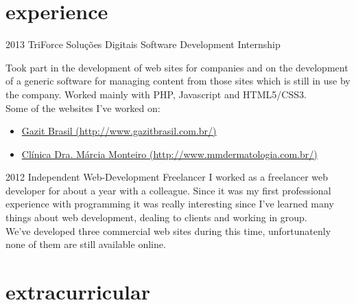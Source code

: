 \documentclass[]{friggeri-cv} %
\begin{document}

\section{experience}

\begin{entrylist}


\entry
{2013}
{TriForce Soluções Digitais}
{Software Development Internship}
{Took part in the development of web sites for companies and on the development of a generic software for managing content from those sites which is still in use by the company. Worked mainly with PHP, Javascript and HTML5/CSS3. \\
Some of the websites I've worked on:
\begin{itemize}
\item \href{http://www.gazitbrasil.com.br/}{Gazit Brasil (http://www.gazitbrasil.com.br/)}
\item \href{http://www.mmdermatologia.com.br/}{Clínica Dra. Márcia Monteiro (http://www.mmdermatologia.com.br/)}
\end{itemize}}

\entry
{2012}
{Independent Web-Development}
{Freelancer}
{I worked as a freelancer web developer for about a year with a colleague. Since it was my first professional experience with programming it was really interesting since I've learned many things about web development, dealing to clients and working in group. \\
We've developed three commercial web sites during this time, unfortunatenly none of them are still available online.}

\end{entrylist}


\section{extracurricular}
\end{document}
